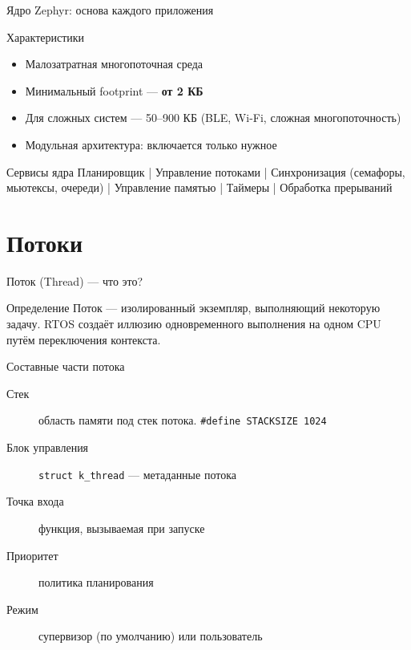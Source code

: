 \documentclass[12pt,aspectratio=169]{beamer}
\begin{document}
\begin{frame}{Ядро Zephyr: основа каждого приложения}
\begin{block}{Характеристики}
\begin{itemize}
  \item Малозатратная многопоточная среда
  \item Минимальный footprint --- \textbf{от 2 КБ}
  \item Для сложных систем --- 50--900 КБ (BLE, Wi-Fi, сложная многопоточность)
  \item Модульная архитектура: включается только нужное
\end{itemize}
\end{block}

\vspace{4pt}
\begin{block}{Сервисы ядра}
Планировщик \;|\; Управление потоками \;|\;
Синхронизация (семафоры, мьютексы, очереди) \;|\;
Управление памятью \;|\; Таймеры \;|\; Обработка прерываний
\end{block}
\end{frame}


\section{Потоки}

\begin{frame}{Поток (Thread) --- что это?}
\begin{block}{Определение}
Поток --- изолированный экземпляр, выполняющий некоторую задачу.
RTOS создаёт иллюзию одновременного выполнения на одном CPU
путём переключения контекста.
\end{block}

\pause
\begin{block}{Составные части потока}
\begin{description}
  \item[Стек] область памяти под стек потока. \texttt{\#define STACKSIZE 1024}
  \item[Блок управления] \texttt{struct k\_thread} --- метаданные потока
  \item[Точка входа] функция, вызываемая при запуске
  \item[Приоритет] политика планирования
  \item[Режим] супервизор (по умолчанию) или пользователь
\end{description}
\end{block}
\end{frame}
\end{document}
